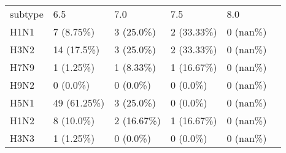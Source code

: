 \begin{tabular}{L{.4in}|L{.6in}|L{.6in}|L{.6in}|L{.6in}|L{.6in}}\hline
subtype&6.5&7.0&7.5&8.0\\
H1N1& 7  (8.75\%) & 3  (25.0\%) & 2  (33.33\%) & 0  (nan\%) \\
H3N2& 14  (17.5\%) & 3  (25.0\%) & 2  (33.33\%) & 0  (nan\%) \\
H7N9& 1  (1.25\%) & 1  (8.33\%) & 1  (16.67\%) & 0  (nan\%) \\
H9N2& 0  (0.0\%) & 0  (0.0\%) & 0  (0.0\%) & 0  (nan\%) \\
H5N1& 49  (61.25\%) & 3  (25.0\%) & 0  (0.0\%) & 0  (nan\%) \\
H1N2& 8  (10.0\%) & 2  (16.67\%) & 1  (16.67\%) & 0  (nan\%) \\
H3N3& 1  (1.25\%) & 0  (0.0\%) & 0  (0.0\%) & 0  (nan\%) \\
\hline\end{tabular}
